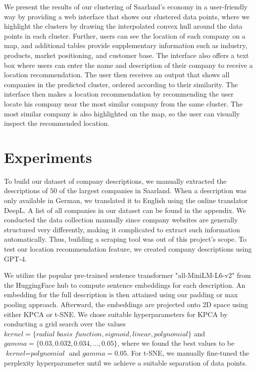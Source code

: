 \documentclass[conference]{IEEEtran}
\begin{document}
We present the results of our clustering of Saarland's economy in a user-friendly way by providing a web interface that shows our clustered data points, where we highlight the clusters by drawing the interpolated convex hull around the data points in each cluster. Further, users can see the location of each company on a map, and additional tables provide supplementary information such as industry, products, market positioning, and customer base. The interface also offers a text box where users can enter the name and description of their company to receive a location recommendation. The user then receives an output that shows all companies in the predicted cluster, ordered according to their similarity. The interface then makes a location recommendation by recommending the user locate his company near the most similar company from the same cluster. The most similar company is also highlighted on the map, so the user can visually inspect the recommended location.

\section{Experiments}

To build our dataset of company descriptions, we manually extracted the descriptions of $50$ of the largest companies in Saarland. When a description was only available in German, we translated it to English using the online translator DeepL. A list of all companies in our dataset can be found in the appendix. We conducted the data collection manually since company websites are generally structured very differently, making it complicated to extract such information automatically. Thus, building a scraping tool was out of this project's scope. To test our location recommendation feature, we created company descriptions using GPT-4.

We utilize the popular pre-trained sentence transformer "all-MiniLM-L6-v2" from the HuggingFace hub to compute sentence embeddings for each description. An embedding for the full description is then attained using our padding or max pooling approach.
Afterward, the embeddings are projected onto 2D space using either KPCA or t-SNE. We chose suitable hyperparameters for KPCA by conducting a grid search over the values $\textit{kernel} = \{\textit{radial basis function}, \textit{sigmoid}, \textit{linear}, \textit{polynomial} \}$ and $\textit{gamma} = \{0.03, 0.032, 0.034, \dots, 0.05\}$, where we found the best values to be $\textit{kernel} = \textit{polynomial}$ and $\textit{gamma} = 0.05$. For t-SNE, we manually fine-tuned the perplexity hyperparameter until we achieve a suitable separation of data points.
\end{document}
